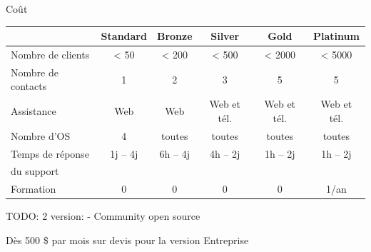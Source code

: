 \documentclass[aspectratio=169]{beamer}
\newcommand{\TODO}{TODO:}
\begin{document}
\begin{frame}{Coût}
\begin{center}

 \begin{tabular}{|l|ccccc|}
    \hline
    & Standard & Bronze & Silver & Gold & Platinum \\
    \hline
    \hline
    Nombre de clients & < 50 & < 200 & < 500 & < 2000 & < 5000 \\
    \hline
    Nombre de contacts & 1 & 2 & 3 & 5 & 5 \\
    \hline
    Assistance & Web & Web & Web et tél.& Web et tél. & Web et tél. \\
    \hline
    Nombre d'OS & 4 & toutes & toutes & toutes & toutes \\
    \hline
    Temps de réponse & 1j -- 4j & 6h -- 4j & 4h -- 2j & 1h -- 2j & 1h -- 2j \\
    du support &  \\
    \hline
    Formation & 0 & 0 & 0 & 0 & 1/an \\
    \hline
 \end{tabular}
\end{center}

\TODO
2 version: - Community open source

Dès 500 \$ par mois sur devis pour la version Entreprise
\end{frame}
\end{document}
